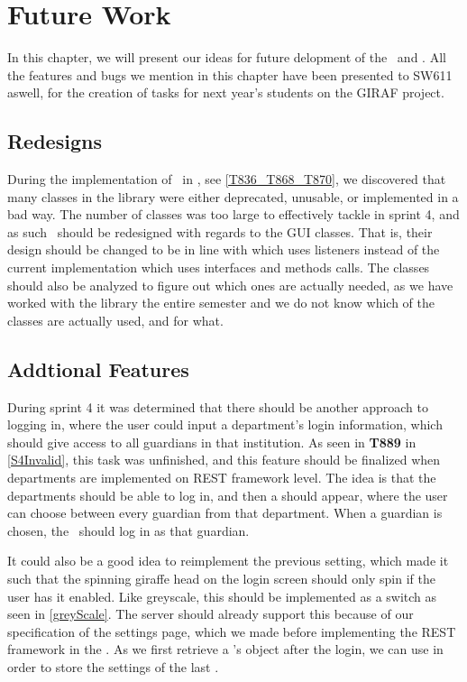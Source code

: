 \chapter{Future Work}\label{fwork}
In this chapter, we will present our ideas for future delopment of the
\lapp\ and \clib. All the features and bugs we mention in this chapter have been
presented to SW611 aswell, for the creation of tasks for next year's students on
the GIRAF project.

\section{Redesigns}
During the implementation of \rlib\ in \clib, see
\autoref{T836_T868_T870}, we discovered that many classes in the library were
either deprecated, unusable, or implemented in a bad way. The number of classes
was too large to effectively tackle in sprint 4, and as such \clib\ should be
redesigned with regards to the GUI classes. That is, their design should be
changed to be in line with  which uses listeners instead
of the current implementation which uses interfaces and methods calls.
The classes should also be analyzed to figure out which ones are actually
needed, as we have worked with the library the entire semester and we do not
know which of the classes are actually used, and for what.

\section{Addtional Features}
During sprint 4 it was determined that there should be another approach to
logging in, where the user could input a department's login information, which
should give access to all guardians in that institution. As seen in
\textbf{T889} in \autoref{S4Invalid}, this task was unfinished, and this feature
should be finalized when departments are implemented on REST framework level.
The idea is that the departments should be able to log in, and then a
 should appear, where the user can choose between
every guardian from that department. When a guardian is chosen, the \lapp\
should log in as that guardian.\nl

It could also be a good idea to reimplement the previous setting, which made it
such that the spinning giraffe head on the login screen should only spin if the
user has it enabled. Like greyscale, this should be implemented as a switch as
seen in \autoref{greyScale}. The server should already support this
because of our specification of the settings page, which we made before
implementing the REST framework in the \textc{Launcher}. As we first retrieve a
\ttt{User}'s \ttt{Settings} object after the login, we can use
 in order to store the settings of the last .

